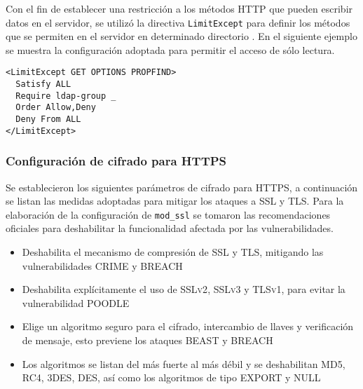 Con el fin de establecer una restricci\'{o}n a los m\'{e}todos \textsc{\gls{HTTP}} que pueden escribir datos en el servidor, se utiliz\'{o} la directiva \texttt{LimitExcept} para definir los m\'{e}todos que se permiten en el servidor en determinado directorio \cite{_core_????}. En el siguiente ejemplo se muestra la configuraci\'{o}n adoptada para permitir el acceso de s\'{o}lo lectura.

{
\scriptsize
\linespread{1}
\begin{verbatim}
<LimitExcept GET OPTIONS PROPFIND>
  Satisfy ALL
  Require ldap-group _
  Order Allow,Deny
  Deny From ALL
</LimitExcept>
\end{verbatim}
}

        \subsubsection{Configuraci\'{o}n de cifrado para \textsc{HTTPS}}

Se establecieron los siguientes par\'{a}metros de cifrado para \textsc{\gls{HTTPS}}, a continuaci\'{o}n se listan las medidas adoptadas para mitigar los ataques a \textsc{\gls{SSL}} y \textsc{\gls{TLS}}. Para la elaboraci\'{o}n de la configuraci\'{o}n de \texttt{mod\_ssl} se tomaron las recomendaciones oficiales para deshabilitar la funcionalidad afectada por las vulnerabilidades\cite{_ssl_????-2}\cite{goodin_crack_2012}\cite{_breach_????}\cite{_ssl-poodle.pdf_????}\cite{_heartbleed_????}\cite{_tracking_????}.

\begin{itemize}
  \item Deshabilita el mecanismo de compresi\'{o}n de \textsc{\gls{SSL}} y \textsc{\gls{TLS}}, mitigando las vulnerabilidades \textsc{CRIME}\cite{_crime_????} y \textsc{BREACH}\cite{_breach_????}
  \item Deshabilita expl\'{i}citamente el uso de \textsc{SSLv2}, \textsc{SSLv3} y \textsc{TLSv1}, para evitar la vulnerabilidad \textsc{POODLE}\cite{_poodle_????}
  \item Elige un algoritmo seguro para el cifrado, intercambio de llaves y verificaci\'{o}n de mensaje, esto previene los ataques \textsc{BEAST}\cite{_beast.pdf_????} y \textsc{BREACH}\cite{_breach_????}
  \item Los algoritmos se listan del m\'{a}s fuerte al m\'{a}s d\'{e}bil y se deshabilitan \textsc{MD5}, \textsc{RC4}, \textsc{3DES}, \textsc{DES}, as\'{i} como los algoritmos de tipo \textsc{EXPORT} y \textsc{NULL}
\end{itemize}

